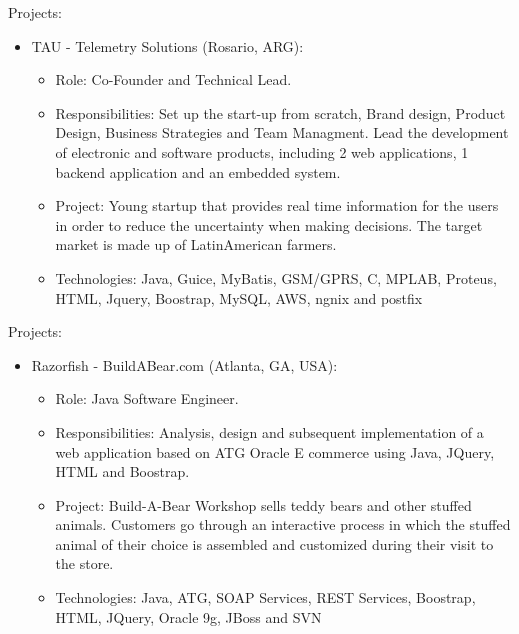 \documentclass[11pt,a4paper,sans]{moderncv}        %
\begin{document}
  {
    Projects:\\
    \begin{itemize}
      \item TAU - Telemetry Solutions (Rosario, ARG):
        \begin{itemize}
          \item Role: Co-Founder and Technical Lead. 
          \item Responsibilities: Set up the start-up from scratch, Brand design, Product Design, Business Strategies and Team Managment. Lead the development of electronic and software products, including 2 web applications, 1 backend application and an embedded system. 
          \item Project: Young startup that provides real time information for the users in order to reduce the uncertainty when making decisions. The target market is made up of LatinAmerican farmers.
          \item Technologies: Java, Guice, MyBatis, GSM/GPRS, C, MPLAB, Proteus, HTML, Jquery, Boostrap, MySQL, AWS, ngnix and postfix
        \end{itemize}
    \end{itemize}
  }

  {
    Projects:\\
    \begin{itemize}
      \item Razorfish - BuildABear.com (Atlanta, GA, USA):
        \begin{itemize}
          \item Role: Java Software Engineer. 
          \item Responsibilities: Analysis, design and subsequent implementation of a web application based on ATG Oracle E commerce using Java, JQuery, HTML and Boostrap.
          \item Project: Build-A-Bear Workshop sells teddy bears and other stuffed animals. Customers go through an interactive process in which the stuffed animal of their choice is assembled and customized during their visit to the store.
          \item Technologies: Java, ATG, SOAP Services, REST Services, Boostrap, HTML, JQuery, Oracle 9g, JBoss and SVN 
        \end{itemize}
    \end{itemize}
  }
\end{document}
